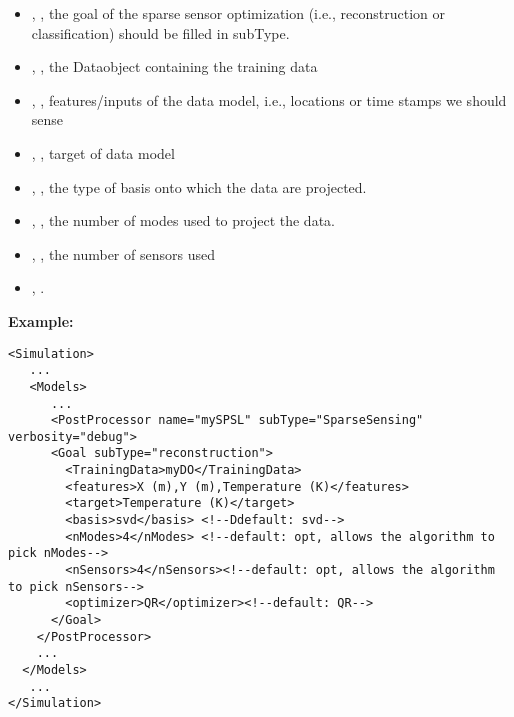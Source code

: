 \begin{itemize}
\item {}, \xmlDesc{[reconstruction]}, the goal of the sparse sensor optimization (i.e., reconstruction or classification) should be filled in subType.
\item {}, , the Dataobject containing the training data
\item {}, , features/inputs of the data model, i.e., locations or time stamps we should sense
\item {}, , target of data model
\item {} , , the type of basis onto which the data are projected. 
\item {},  , the number of modes  used to project the data.
\item {},  , the number of sensors used
\item {},  \xmlDesc{[QR, CCQR]}.
\end{itemize}

\textbf{Example:}
\begin{lstlisting}[style=XML]
<Simulation>
   ...
   <Models>
      ...
      <PostProcessor name="mySPSL" subType="SparseSensing" verbosity="debug">
      <Goal subType="reconstruction">
        <TrainingData>myDO</TrainingData>
        <features>X (m),Y (m),Temperature (K)</features>
        <target>Temperature (K)</target>
        <basis>svd</basis> <!--Ddefault: svd-->
        <nModes>4</nModes> <!--default: opt, allows the algorithm to pick nModes-->
        <nSensors>4</nSensors><!--default: opt, allows the algorithm to pick nSensors-->
        <optimizer>QR</optimizer><!--default: QR-->
      </Goal>
    </PostProcessor>
    ...
  </Models>
   ...
</Simulation>
\end{lstlisting}